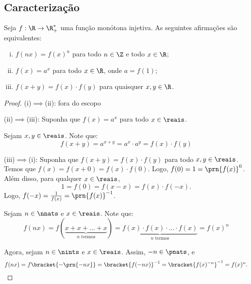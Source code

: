 \subsection{Caracterização}

\begin{theorem}
\label{theo:caracterizacao-funcao-exponencial}
Seja $f: \R \to \R_+^*$ uma função monótona injetiva. As
seguintes afirmações são equivalentes:
\begin{enumerate}[(i)]
  \item $f(nx) = f(x)^n$ para todo $n \in \Z$ e todo $x \in \R$;
  \item $f(x) = a^x$ para todo $x\in \R$, onde $a = f(1)$;
  \item $f(x+y) = f(x)\cdot f(y)$ para quaisquer $x, y \in \R$.
\end{enumerate}
\end{theorem}

\begin{proof}
  \item (i)$\implies$(ii): fora do escopo
  \item (ii)$\implies$(iii): Suponha que $f(x) = a^x$ para todo $x \in \reais$.
  
  Sejam $x,y \in \reais$. Note que:
  \[
      f(x+y)=a^{x+y}=a^x \cdot a^y = f(x)\cdot f(y)
  \]
  \item (iii)$\implies$(i): Suponha que $f(x+y) = f(x)\cdot f(y)$ para todo $x,y\in\reais$. 
  Temos que $f(x)=f(x+0) = f(x)\cdot f(0)$. 
  Logo, $f(0)=1=\prn{f(x)}^0$.
  Além disso, para qualquer $x\in\reais$,
  \[
      1=f(0)=f(x-x)=f(x)\cdot f(-x).
  \]
  Logo, $f(-x) = \frac{1}{f(x)} = \prn{f(x)}^{-1}$.

  Sejam $n \in \nnats$ e $x \in \reais$. Note que:
  \[
      f(nx)=f(\underbrace{x+x+\dots + x}_{\text{$n$ termos}}) = 
      \underbrace{f(x)\cdot f(x) \cdot \dots \cdot f(x)}_{\text{$n$ termos}} = f(x)^n
  \]

  Agora, sejam $n \in \nints$ e $x \in \reais$. Assim, $-n \in \pnats$, e
  \[
      f(nx) = f\bracket{-\prn{-nx}} = \bracket{f(-nx)}^{-1} = \bracket{f(x)^{-n}}^{-1} = f(x)^n.
  \]
\end{proof}